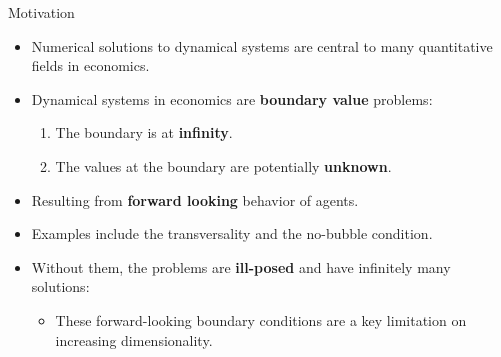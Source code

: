 \documentclass[aspectratio=169,10pt]{beamer}
\newcommand{\emphcolor}[1]{\textbf{\textcolor{emphcolorval}{#1}}}
\begin{document}
\begin{frame}{Motivation}
	\begin{itemize}
		\item Numerical solutions to dynamical systems are central to many quantitative fields in economics.
		\vspace{0.1in}
		\item Dynamical systems in economics are \emphcolor{boundary value} problems:
		\vspace{0.1in}
		\begin{enumerate}
				\item The boundary is at \emphcolor{infinity}.
				\vspace{0.05in}
				\item The values at the boundary are potentially \emphcolor{unknown}.
				\vspace{0.05in}  
		\end{enumerate}
		\item Resulting from \emphcolor{forward looking} behavior of agents.
		\vspace{0.1in}
		\item Examples include the transversality and the no-bubble condition.
		\vspace{0.1in}
		\item Without them, the problems are \emphcolor{ill-posed}  and have infinitely many solutions: 
		\vspace{0.1in}
		\begin{itemize}
			\item These forward-looking boundary conditions are a key limitation on increasing dimensionality.
		\end{itemize}
	\end{itemize}
\end{frame}
\end{document}
